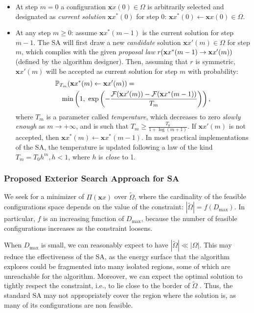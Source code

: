 \documentclass[draftcls,onecolumn]{IEEEtran}
\theoremstyle{plain}
\theoremstyle{definition}
\def\config{\mathbf{x}}
\def\objective{{\Pi}} \def\constraint{{\cal D}}
\def\constraintmax{D_{\mbox{{\tiny max}}}}
\def\augmented{{\cal F}}
\def\objective{{\Pi}} \def\constraint{D_c} \def\constraintmax{D_{\mbox{{\tiny max}}}}
\def\augmented{{\cal F}}
\begin{document}
\begin{itemize}
	\item At step $m=0$ a configuration $\config{x}(0) \in \Omega$ is arbitrarily selected and designated as {\it current solution} $\config{x}^*(0)$ for step $0$: $\config{x}^*(0) \leftarrow \config{x}(0) \in \Omega$.
	\item At any step $m \geq 0$: assume $\config{x}^*(m-1)$ is the current solution for step $m-1$.
The SA will first draw a new {\it candidate} solution $\config{x}'(m) \in \Omega$ for step $m$, which complies with the given {\it proposal law} $\proposal(\config{x}^*(m-1) \rightarrow \config{x}'(m))$ (defined by the algorithm designer). 
Then, assuming that $r$ is symmetric, $\config{x}'(m)$ will be accepted as current solution for step $m$ with probability:  
\begin{eqnarray}
  \lefteqn{\mathbb{P}_{T_m}(\config{x}^*(m) \leftarrow \config{x}'(m))=} \notag \\ 
  &&\min\left(1,\ \exp \left( - \dfrac{\augmented(\config{x}'(m)) - \augmented(\config{x}^*(m-1))}{T_m} \right)\right),  \notag
\end{eqnarray}
where $T_m$ is a parameter called {\it temperature}, which decreases to zero {\it slowly enough}  as $m\rightarrow+\infty$, and is such that $T_m \geq \frac{T_0}{1 + \log (m+1)}$.
If $\config{x}'(m)$ is not accepted, then $\config{x}^*(m) \leftarrow \config{x}^*(m-1)$. In most practical implementations of the SA, the temperature is updated following a law of the kind $T_m = T_0h^m, h<1$, where $h$ is {\it close} to 1.
\end{itemize}



\subsubsection{Proposed Exterior Search Approach for SA}
We seek for a minimizer of $\objective( \config{x})$ over $\tilde{\Omega}$, where the cardinality of the feasible configurations space  depends on the value of the constraint: $|\tilde{\Omega}|=f(D_{\max})$. In particular, $f$ is an increasing function of $D_{\max}$, because the number of feasible configurations increases as the constraint loosens. 

When $D_{\max}$ is small, we can reasonably expect to have $|\tilde{\Omega}|\ll |\Omega|$. This may reduce the effectiveness of the SA, as the energy surface that the algorithm explores could be fragmented into many isolated regions, some of which are unreachable for the algorithm. Moreover, we can expect the optimal solution to tightly respect the constraint, i.e., to lie close to the border of $\tilde{\Omega}$ \cite{Siedlecki89}. Thus, the standard SA may not appropriately cover the region where the solution is, as many of its configurations are non feasible.   
\end{document}
